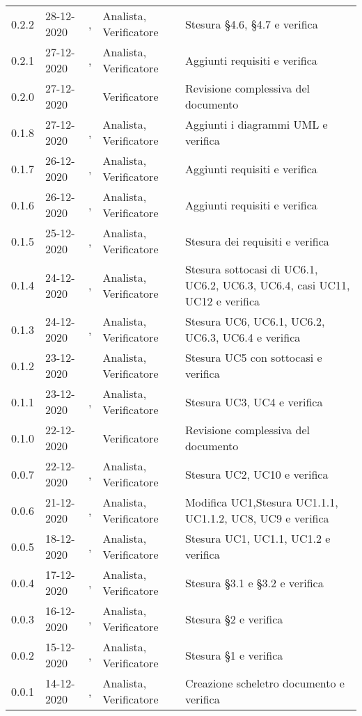 {{\begin{longtable}{C{1.7cm} | C{2.5cm} | C{3.2cm} | C{2.7cm}  | C{4.8cm}}
0.2.2 & 28-12-2020 & \BM{}, \RA{} & Analista, Verificatore & Stesura §4.6, §4.7 e verifica\\
0.2.1 & 27-12-2020 & \SG{}, \RA{} & Analista, Verificatore & Aggiunti requisiti e verifica\\

0.2.0 & 27-12-2020 & \RA{} & Verificatore & Revisione complessiva del documento \\

0.1.8 & 27-12-2020 & \SP{}, \RA{} & Analista, Verificatore & Aggiunti i diagrammi UML e verifica\\
0.1.7 & 26-12-2020 & \SP{}, \PA{} & Analista, Verificatore & Aggiunti requisiti e verifica\\
0.1.6 & 26-12-2020 & \BM{}, \PA{} & Analista, Verificatore & Aggiunti requisiti e verifica\\
0.1.5 & 25-12-2020 & \SG{}, \PA{} & Analista, Verificatore & Stesura dei requisiti  e verifica\\
0.1.4 & 24-12-2020 & \SP{}, \RA{} & Analista, Verificatore & Stesura sottocasi di UC6.1, UC6.2, UC6.3, UC6.4, casi UC11, UC12 e verifica\\
0.1.3 & 24-12-2020 & \SG{}, \RA{} & Analista, Verificatore & Stesura UC6, UC6.1, UC6.2, UC6.3, UC6.4 e verifica\\
0.1.2 & 23-12-2020 & \SP{, \RA{}} & Analista, Verificatore & Stesura UC5 con sottocasi e verifica\\

0.1.1 & 23-12-2020 & \BM{}, \RA{} & Analista, Verificatore & Stesura UC3, UC4 e verifica\\

0.1.0 & 22-12-2020 & \PA{} & Verificatore & Revisione complessiva del documento \\

0.0.7 & 22-12-2020 & \SG{}, \PA{} & Analista, Verificatore & Stesura UC2, UC10 e verifica\\
0.0.6 & 21-12-2020 & \BM{}, \PA{} & Analista, Verificatore & Modifica UC1,\newline Stesura UC1.1.1, UC1.1.2, UC8, UC9 e verifica\\
0.0.5 & 18-12-2020 & \SP{}, \RA{} & Analista, Verificatore & Stesura UC1, UC1.1, UC1.2 e verifica\\
0.0.4 & 17-12-2020 & \SP{}, \RA{} & Analista, Verificatore & Stesura §3.1 e §3.2 e verifica\\	
0.0.3 & 16-12-2020 & \SP{}, \PA{} & Analista, Verificatore & Stesura §2 e verifica\\
0.0.2 & 15-12-2020 & \SP{}, \PA{} & Analista, Verificatore & Stesura §1 e verifica\\
0.0.1 & 14-12-2020 & \SP{}, \PA{} & Analista, Verificatore & Creazione scheletro documento e verifica\\
		
\end{longtable}
}
}

